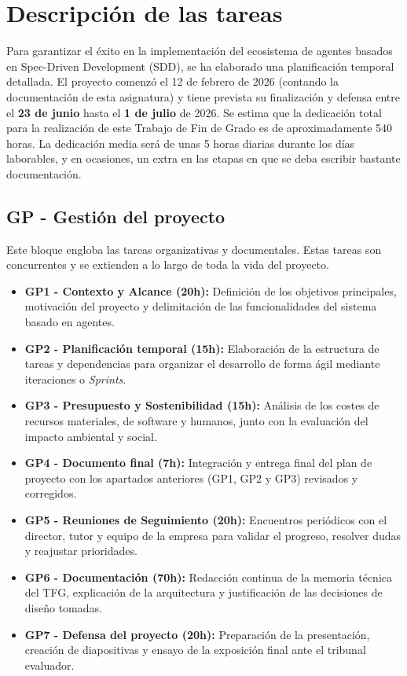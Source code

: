 \documentclass[11pt, letterpaper]{article}
\begin{document}
\newpage

\section{Descripción de las tareas}
Para garantizar el éxito en la implementación del ecosistema de agentes basados en Spec-Driven Development (SDD), se ha elaborado una planificación temporal detallada. El proyecto comenzó el 12 de febrero de 2026 (contando la documentación de esta asignatura) y tiene prevista su finalización y defensa entre el \textbf{23 de junio} hasta el \textbf{1 de julio} de 2026. Se estima que la dedicación total para la realización de este Trabajo de Fin de Grado es de aproximadamente 540 horas. La dedicación media será de unas 5 horas diarias durante los días laborables, y en ocasiones, un extra en las etapas en que se deba escribir bastante documentación.

\subsection{GP - Gestión del proyecto}
Este bloque engloba las tareas organizativas y documentales. Estas tareas son concurrentes y se extienden a lo largo de toda la vida del proyecto.
\begin{itemize}
    \item \textbf{GP1 - Contexto y Alcance (20h):} Definición de los objetivos principales, motivación del proyecto y delimitación de las funcionalidades del sistema basado en agentes.
    \item \textbf{GP2 - Planificación temporal (15h):} Elaboración de la estructura de tareas y dependencias para organizar el desarrollo de forma ágil mediante iteraciones o \textit{Sprints}.
    \item \textbf{GP3 - Presupuesto y Sostenibilidad (15h):} Análisis de los costes de recursos materiales, de software y humanos, junto con la evaluación del impacto ambiental y social.
    \item \textbf{GP4 - Documento final (7h):} Integración y entrega final del plan de proyecto con los apartados anteriores (GP1, GP2 y GP3) revisados y corregidos. 
    \item \textbf{GP5 - Reuniones de Seguimiento (20h):} Encuentros periódicos con el director, tutor y equipo de la empresa para validar el progreso, resolver dudas y reajustar prioridades.
    \item \textbf{GP6 - Documentación (70h):} Redacción continua de la memoria técnica del TFG, explicación de la arquitectura y justificación de las decisiones de diseño tomadas.
    \item \textbf{GP7 - Defensa del proyecto (20h):} Preparación de la presentación, creación de diapositivas y ensayo de la exposición final ante el tribunal evaluador.
\end{itemize}
\newpage
\end{document}
